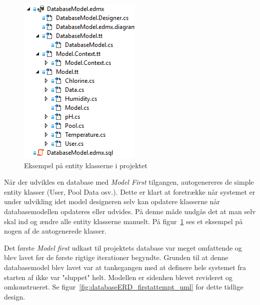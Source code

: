 \begin{figure}
\centering
\includegraphics[width=0.35\linewidth]{figs/generatedFiles}
\caption{Eksempel på entity klasserne i projektet}
\label{fig:generatedFiles}
\end{figure}

Når der udvikles en database med \textit{Model First} tilgangen, autogenereres de simple entity klasser (User, Pool Data osv.). Dette er klart at foretrække når systemet er under udvikling idet model designeren selv kan opdatere klasserne når databasemodellen opdateres eller udvides. På denne måde undgås det at man selv skal ind og ændre alle entity klasserne manuelt. På figur~\ref{fig:generatedFiles} ses et eksempel på nogen af de autogenerede klasser.

Det første \textit{Model first} udkast til projektets database var meget omfattende og blev lavet før de første rigtige iterationer begyndte. Grunden til at denne databasemodel blev lavet var at tankegangen med at definere hele systemet fra starten af ikke var "sluppet" helt. Modellen er sidenhen blevet revideret og omkonstrueret. Se figur~\ref{fig:databaseERD_firstattempt_uml} for dette tidlige design.

